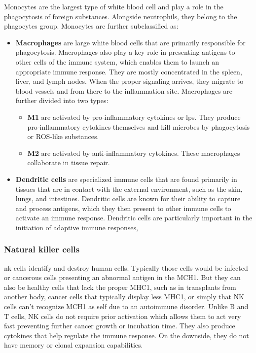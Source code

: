     Monocytes are the largest type of white blood cell and play a role in the phagocytosis of foreign substances. Alongside neutrophils, they belong to the phagocytes group. Monocytes are further subclassified as:

    \begin{itemize}
        
        \item{\textbf{Macrophages}} are large white blood cells that are primarily responsible for phagocytosis. Macrophages also play a key role in presenting antigens to other cells of the immune system, which enables them to launch an appropriate immune response. They are mostly concentrated in the spleen, liver, and lymph nodes. When the proper signaling arrives, they migrate to blood vessels and from there to the inflammation site. Macrophages are further divided into two types:

            \begin{itemize}

                \item{\textbf{M1}} are activated by pro-inflammatory cytokines or \gls{lps}. They produce pro-inflammatory cytokines themselves and kill microbes by phagocytosis or ROS-like substances.
                
                \item{\textbf{M2}} are activated by anti-inflammatory cytokines. These macrophages collaborate in tissue repair.

            \end{itemize}
            
        \item{\textbf{Dendritic cells}} are specialized immune cells that are found primarily in tissues that are in contact with the external environment, such as the skin, lungs, and intestines. Dendritic cells are known for their ability to capture and process antigens, which they then present to other immune cells to activate an immune response. Dendritic cells are particularly important in the initiation of adaptive immune responses,

    \end{itemize}

\subsubsection{Natural killer cells}

\gls{nk} cells identify and destroy human cells. Typically those cells would be infected or cancerous cells presenting an abnormal antigen in the MCH1. But they can also be healthy cells that lack the proper MHC1, such as in transplants from another body, cancer cells that typically display less MHC1, or simply that NK cells can't recognize MCH1 as self due to an autoimmune disorder. Unlike B and T cells, NK cells do not require prior activation which allows them to act very fast preventing further cancer growth or incubation time. They also produce cytokines that help regulate the immune response. On the downside, they do not have memory or clonal expansion capabilities.

